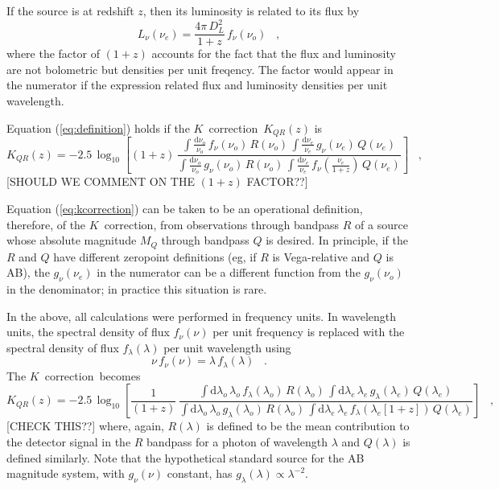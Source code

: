 \documentclass[preprint]{aastex}
\newcommand{\kcorrection}{$K$~correction}
\begin{document}
If the source is at redshift $z$, then its luminosity is related to
its flux by
\begin{equation}
L_{\nu}(\nu_e) = \frac{4\pi\,D_L^2}{1+z}\,f_{\nu}(\nu_o) \;\;\;,
\end{equation}
where the factor of $(1+z)$ accounts for the fact that the flux and
luminosity are not bolometric but densities per unit freqency.  The
factor would appear in the numerator if the expression related flux
and luminosity densities per unit wavelength.

Equation (\ref{eq:definition}) holds if the \kcorrection\ $K_{QR}(z)$
is
\begin{equation}
\label{eq:kcorrection}
K_{QR}(z) = -2.5\,\log_{10}\left[(1+z)\,
  \frac{\displaystyle
          \int\frac{\mathrm{d}\nu_o}{\nu_o}\,f_{\nu}(\nu_o)\,R(\nu_o)\,
          \int\frac{\mathrm{d}\nu_e}{\nu_e}\,g_{\nu}(\nu_e)\,Q(\nu_e)}
       {\displaystyle
          \int\frac{\mathrm{d}\nu_o}{\nu_o}\,g_{\nu}(\nu_o)\,R(\nu_o)\,
          \int\frac{\mathrm{d}\nu_e}{\nu_e}\,
            f_{\nu}\left(\frac{\nu_e}{1+z}\right)\,Q(\nu_e)}
\right] \;\;\;,
\end{equation}
[SHOULD WE COMMENT ON THE $(1+z)$ FACTOR??]

Equation (\ref{eq:kcorrection}) can be taken to be an operational
definition, therefore, of the \kcorrection, from observations through
bandpass $R$ of a source whose absolute magnitude $M_Q$ through
bandpass $Q$ is desired.  In principle, if the $R$ and $Q$ have
different zeropoint definitions (eg, if $R$ is Vega-relative and $Q$
is AB), the $g_{\nu}(\nu_e)$ in the numerator can be a different
function from the $g_{\nu}(\nu_o)$ in the denominator; in practice
this situation is rare.

In the above, all calculations were performed in frequency units.  In
wavelength units, the spectral density of flux $f_{\nu}(\nu)$ per unit
frequency is replaced with the spectral density of flux
$f_{\lambda}(\lambda)$ per unit wavelength using
\begin{equation}
\nu\,f_{\nu}(\nu) = \lambda\,f_{\lambda}(\lambda) \;\;\;.
\end{equation}
The \kcorrection\ becomes
\begin{equation}
K_{QR}(z) = -2.5\,\log_{10}\left[\frac{1}{(1+z)}\,
  \frac{\displaystyle
    \int\mathrm{d}\lambda_o\,\lambda_o\,f_{\lambda}(\lambda_o)\,R(\lambda_o)\,
      \int\mathrm{d}\lambda_e\,\lambda_e\,
      g_{\lambda}(\lambda_e)\,     Q(\lambda_e)}
       {\displaystyle
    \int\mathrm{d}\lambda_o\,\lambda_o\,g_{\lambda}(\lambda_o)\,R(\lambda_o)\,
      \int\mathrm{d}\lambda_e\,\lambda_e\,
      f_{\lambda}(\lambda_e[1+z])\,Q(\lambda_e)}
\right] \;\;\;,
\end{equation}
[CHECK THIS??] where, again, $R(\lambda)$ is defined to be the mean
contribution to the detector signal in the $R$ bandpass for a photon
of wavelength $\lambda$ and $Q(\lambda)$ is defined similarly.  Note
that the hypothetical standard source for the AB magnitude system,
with $g_{\nu}(\nu)$ constant, has
$g_{\lambda}(\lambda)\propto\lambda^{-2}$.
\end{document}
